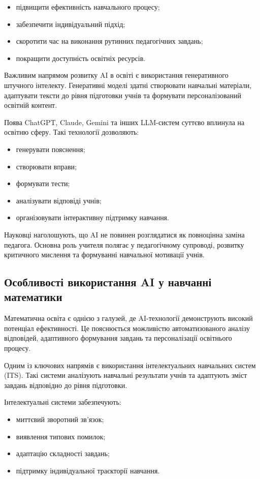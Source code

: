 \begin{itemize}
\item підвищити ефективність навчального процесу;
\item забезпечити індивідуальний підхід;
\item скоротити час на виконання рутинних педагогічних завдань;
\item покращити доступність освітніх ресурсів.
\end{itemize}

Важливим напрямом розвитку AI в освіті є використання генеративного штучного інтелекту. Генеративні моделі здатні створювати навчальні матеріали, адаптувати тексти до рівня підготовки учнів та формувати персоналізований освітній контент.

Поява ChatGPT, Claude, Gemini та інших LLM-систем суттєво вплинула на освітню сферу. Такі технології дозволяють:

\begin{itemize}
\item генерувати пояснення;
\item створювати вправи;
\item формувати тести;
\item аналізувати відповіді учнів;
\item організовувати інтерактивну підтримку навчання.
\end{itemize}

Науковці наголошують, що AI не повинен розглядатися як повноцінна заміна педагога. Основна роль учителя полягає у педагогічному супроводі, розвитку критичного мислення та формуванні навчальної мотивації учнів.

\subsection{Особливості використання AI у навчанні математики}

Математична освіта є однією з галузей, де AI-технології демонструють високий потенціал ефективності. Це пояснюється можливістю автоматизованого аналізу відповідей, адаптивного формування завдань та персоналізації освітнього процесу.

Одним із ключових напрямів є використання інтелектуальних навчальних систем (ITS). Такі системи аналізують навчальні результати учнів та адаптують зміст завдань відповідно до рівня підготовки.

Інтелектуальні системи забезпечують:

\begin{itemize}
\item миттєвий зворотний зв’язок;
\item виявлення типових помилок;
\item адаптацію складності завдань;
\item підтримку індивідуальної траєкторії навчання.
\end{itemize}

